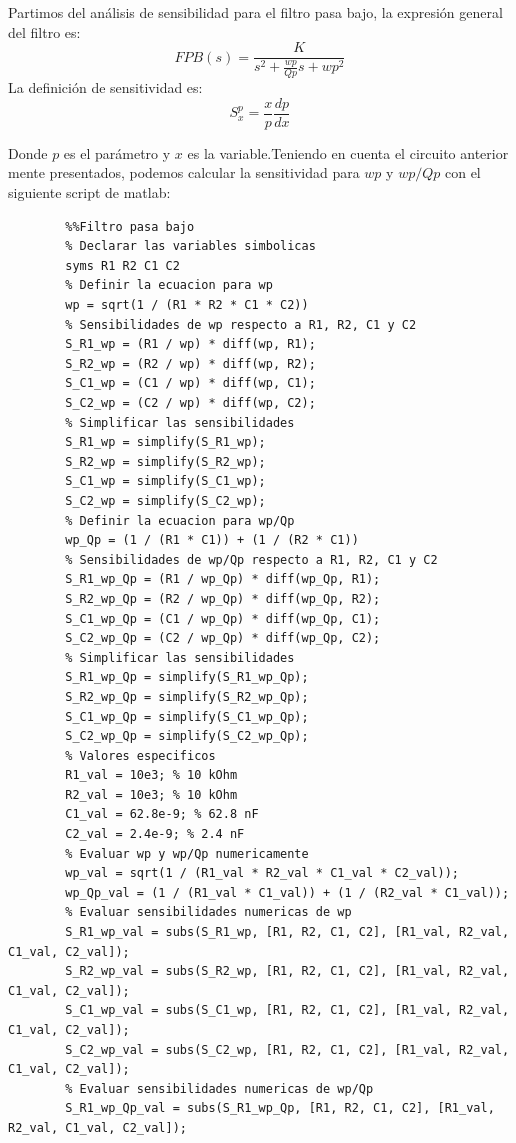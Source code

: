 \documentclass[12pt]{article}
\begin{document}
	Partimos del análisis de sensibilidad para el filtro pasa bajo, la expresión general del filtro es:
	\begin{equation}
		FPB(s)=\frac{K }{s^2+\frac{wp}{Qp}s+wp^2}
	\end{equation}
	La definición de sensitividad es:
	\begin{equation}
		S^p_{x}=\frac{x}{p}\frac{dp}{dx}
	\end{equation}
	
	Donde $p$ es el parámetro y $x$ es la variable.Teniendo en cuenta el circuito anterior mente presentados, podemos calcular la sensitividad para $wp$ y $wp/Qp$ con el siguiente script de matlab:
	 
	 \begin{lstlisting}
	 	%%Filtro pasa bajo
	 	% Declarar las variables simbolicas
	 	syms R1 R2 C1 C2
	 	% Definir la ecuacion para wp
	 	wp = sqrt(1 / (R1 * R2 * C1 * C2))
	 	% Sensibilidades de wp respecto a R1, R2, C1 y C2
	 	S_R1_wp = (R1 / wp) * diff(wp, R1);
	 	S_R2_wp = (R2 / wp) * diff(wp, R2);
	 	S_C1_wp = (C1 / wp) * diff(wp, C1);
	 	S_C2_wp = (C2 / wp) * diff(wp, C2);
	 	% Simplificar las sensibilidades
	 	S_R1_wp = simplify(S_R1_wp);
	 	S_R2_wp = simplify(S_R2_wp);
	 	S_C1_wp = simplify(S_C1_wp);
	 	S_C2_wp = simplify(S_C2_wp);
	 	% Definir la ecuacion para wp/Qp
	 	wp_Qp = (1 / (R1 * C1)) + (1 / (R2 * C1))
	 	% Sensibilidades de wp/Qp respecto a R1, R2, C1 y C2
	 	S_R1_wp_Qp = (R1 / wp_Qp) * diff(wp_Qp, R1);
	 	S_R2_wp_Qp = (R2 / wp_Qp) * diff(wp_Qp, R2);
	 	S_C1_wp_Qp = (C1 / wp_Qp) * diff(wp_Qp, C1);
	 	S_C2_wp_Qp = (C2 / wp_Qp) * diff(wp_Qp, C2);
	 	% Simplificar las sensibilidades
	 	S_R1_wp_Qp = simplify(S_R1_wp_Qp);
	 	S_R2_wp_Qp = simplify(S_R2_wp_Qp);
	 	S_C1_wp_Qp = simplify(S_C1_wp_Qp);
	 	S_C2_wp_Qp = simplify(S_C2_wp_Qp);
	 	% Valores especificos
	 	R1_val = 10e3; % 10 kOhm
	 	R2_val = 10e3; % 10 kOhm
	 	C1_val = 62.8e-9; % 62.8 nF
	 	C2_val = 2.4e-9; % 2.4 nF
	 	% Evaluar wp y wp/Qp numericamente
	 	wp_val = sqrt(1 / (R1_val * R2_val * C1_val * C2_val));
	 	wp_Qp_val = (1 / (R1_val * C1_val)) + (1 / (R2_val * C1_val));
	 	% Evaluar sensibilidades numericas de wp
	 	S_R1_wp_val = subs(S_R1_wp, [R1, R2, C1, C2], [R1_val, R2_val, C1_val, C2_val]);
	 	S_R2_wp_val = subs(S_R2_wp, [R1, R2, C1, C2], [R1_val, R2_val, C1_val, C2_val]);
	 	S_C1_wp_val = subs(S_C1_wp, [R1, R2, C1, C2], [R1_val, R2_val, C1_val, C2_val]);
	 	S_C2_wp_val = subs(S_C2_wp, [R1, R2, C1, C2], [R1_val, R2_val, C1_val, C2_val]);
	 	% Evaluar sensibilidades numericas de wp/Qp
	 	S_R1_wp_Qp_val = subs(S_R1_wp_Qp, [R1, R2, C1, C2], [R1_val, R2_val, C1_val, C2_val]);

\end{lstlisting}
\end{document}

